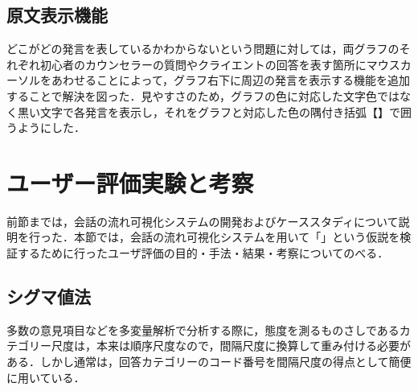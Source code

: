 \documentclass[shuuron]{kuee}
\begin{document}

\subsection{原文表示機能}
どこがどの発言を表しているかわからないという問題に対しては，両グラフのそれぞれ初心者のカウンセラーの質問やクライエントの回答を表す箇所にマウスカーソルをあわせることによって，グラフ右下に周辺の発言を表示する機能を追加することで解決を図った．見やすさのため，グラフの色に対応した文字色ではなく黒い文字で各発言を表示し，それをグラフと対応した色の隅付き括弧【】で囲うようにした．





%
%

\section{ユーザー評価実験と考察}

前節までは，会話の流れ可視化システムの開発およびケーススタディについて説明を行った．本節では，会話の流れ可視化システムを用いて「」という仮説を検証するために行ったユーザ評価の目的・手法・結果・考察についてのべる．%
%
%
%
%
%
%

\subsection{シグマ値法}
多数の意見項目などを多変量解析で分析する際に，態度を測るものさしであるカテゴリー尺度は，本来は順序尺度なので，間隔尺度に換算して重み付ける必要がある．しかし通常は，回答カテゴリーのコード番号を間隔尺度の得点として簡便に用いている．
\end{document}
